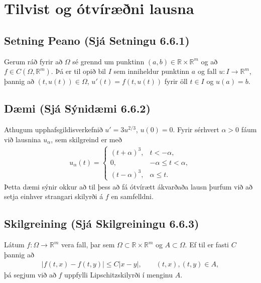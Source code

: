\documentclass[a4paper,10pt,icelandic]{sphinxmanual}
\begin{document}
\section{Tilvist og ótvíræðni lausna}
\label{\detokenize{Kafli06:tilvist-og-otviraeni-lausna}}

\subsection{Setning Peano (Sjá Setningu 6.6.1)}
\label{\detokenize{Kafli06:setning-peano-sja-setningu-6-6-1}}
Gerum ráð fyrir að \(\Omega\) sé grennd um punktinn \((a,b)\in \mathbb{R}\times\mathbb{R}^m\) og að \(f\in C(\Omega,\mathbb{R}^m)\). Þá er til opið bil \(I\) sem inniheldur punktinn \(a\) og fall \(u:I\to \mathbb{R}^m\), þannig að \((t,u(t))\in \Omega\), \(u'(t)=f(t,u(t))\) fyrir öll \(t\in I\) og \(u(a)=b\).


\subsection{Dæmi (Sjá Sýnidæmi 6.6.2)}
\label{\detokenize{Kafli06:daemi-sja-synidaemi-6-6-2}}
Athugum upphafsgildisverkefnið \(u'=3u^{2/3}\), \(u(0)=0\). Fyrir sérhvert \(\alpha>0\) fáum við lausnina \(u_\alpha\), sem skilgreind er með
\begin{equation*}
\begin{split}u_\alpha(t)=\begin{cases}
(t+\alpha)^3, &t<-\alpha,\\
0, &-\alpha\leq t<\alpha,\\
(t-\alpha)^3, &\alpha\leq t.
\end{cases}\end{split}
\end{equation*}
Þetta dæmi sýnir okkur að til þess að fá ótvírætt ákvarðaða lausn þurfum við að setja einhver strangari skilyrði á \(f\) en samfelldni.


\subsection{Skilgreining (Sjá Skilgreiningu 6.6.3)}
\label{\detokenize{Kafli06:skilgreining-sja-skilgreiningu-6-6-3}}
Látum \(f:\Omega\to\mathbb{R}^m\) vera fall, þar sem \(\Omega\subset \mathbb{R}\times \mathbb{R}^m\) og \(A\subset \Omega\). Ef til er fasti \(C\) þannig að
\begin{equation*}
\begin{split}|f(t,x)-f(t,y)|\leq C|x-y|,\qquad (t,x), (t,y)\in
 A,\end{split}
\end{equation*}
þá segjum við að \(f\) uppfylli Lipschitz\textendash{}skilyrði í menginu \(A\).
\end{document}
